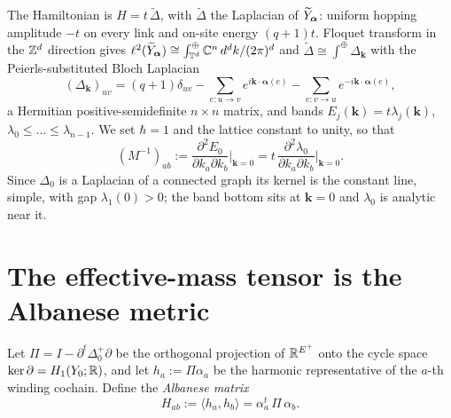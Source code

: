 The Hamiltonian is $H=t\,\widetilde\Delta$, with $\widetilde\Delta$ the Laplacian of $\widetilde Y_{\bm\alpha}$:
uniform hopping amplitude $-t$ on every link and on-site energy $(q{+}1)t$. Floquet
transform in the $\mathbb{Z}^{d}$ direction gives
$\ell^{2}(\widetilde Y_{\bm\alpha})\cong\int^{\oplus}_{\mathbb{T}^{d}}\mathbb{C}^{n}\,d^{d}k/(2\pi)^{d}$ and
$\widetilde\Delta\cong\int^{\oplus}\Delta_{\bm k}$ with the Peierls-substituted Bloch
Laplacian
\begin{equation}\label{Phys1:eq:bloch}
(\Delta_{\bm k})_{uv}=(q{+}1)\delta_{uv}
-\!\!\sum_{e\colon u\to v}\!\! e^{i\bm k\cdot\bm\alpha(e)}
-\!\!\sum_{e\colon v\to u}\!\! e^{-i\bm k\cdot\bm\alpha(e)} ,
\end{equation}
a Hermitian positive-semidefinite $n\times n$ matrix, and bands
$E_j(\bm k)=t\lambda_j(\bm k)$, $\lambda_0\le\dots\le\lambda_{n-1}$. We set $\hbar=1$ and
the lattice constant to unity, so that
\begin{equation}\label{Phys1:eq:massdef}
(M^{-1})_{ab}:=\frac{\partial^{2}E_0}{\partial k_a\partial k_b}\Big|_{\bm k=0}
=t\,\frac{\partial^{2}\lambda_0}{\partial k_a\partial k_b}\Big|_{\bm k=0}.
\end{equation}
Since $\Delta_0$ is a Laplacian of a connected graph its kernel is the constant line, simple,
with gap $\lambda_1(0)>0$; the band bottom sits at $\bm k=0$ and $\lambda_0$ is analytic
near it.

\section{The effective-mass tensor is the Albanese metric}\label{Phys1:sec:mass}

Let $\Pi=I-\partial^{t}\Delta_0^{+}\partial$ be the orthogonal projection of
$\mathbb{R}^{E^{+}}$ onto the cycle space $\ker\partial=H_1(Y_0;\mathbb{R})$, and let
$h_a:=\Pi\alpha_a$ be the harmonic representative of the $a$-th winding cochain. Define the
\emph{Albanese matrix}
\begin{equation}\label{Phys1:eq:H}
H_{ab}:=\langle h_a,h_b\rangle=\alpha_a^{t}\,\Pi\,\alpha_b .
\end{equation}

